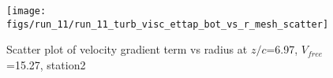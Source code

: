 \begin{figure}[H]
\centering
\texttt{[image: figs/run\_11/run\_11\_turb\_visc\_ettap\_bot\_vs\_r\_mesh\_scatter]}
\caption{Scatter plot of velocity gradient term vs radius at $z/c$=6.97, $V_{free}$=15.27, station2}
\label{fig:run_11_turb_visc_ettap_bot_vs_r_mesh_scatter}
\end{figure}


